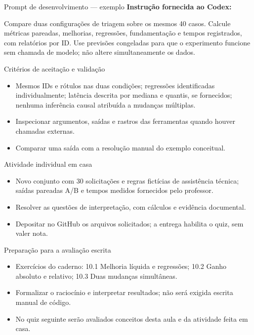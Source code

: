 \documentclass[10pt,aspectratio=169]{beamer}
\begin{document}
\begin{frame}[t]{Prompt de desenvolvimento — exemplo}
\small
\small\textbf{Instrução fornecida ao Codex:}\par\vspace{5mm}Compare duas configurações de triagem sobre os mesmos 40 casos. Calcule métricas pareadas, melhorias, regressões, fundamentação e tempos registrados, com relatórios por ID. Use previsões congeladas para que o experimento funcione sem chamada de modelo; não altere simultaneamente os dados.
\end{frame}

\begin{frame}[t]{Critérios de aceitação e validação}
\small
\begin{itemize}
\item Mesmos IDs e rótulos nas duas condições; regressões identificadas individualmente; latência descrita por mediana e quantis, se fornecidos; nenhuma inferência causal atribuída a mudanças múltiplas.
\item Inspecionar argumentos, saídas e rastros das ferramentas quando houver chamadas externas.
\item Comparar uma saída com a resolução manual do exemplo conceitual.
\end{itemize}
\end{frame}

\begin{frame}[t]{Atividade individual em casa}
\small
\begin{itemize}
\item Novo conjunto com 30 solicitações e regras fictícias de assistência técnica; saídas pareadas A/B e tempos medidos fornecidos pelo professor.
\item Resolver as questões de interpretação, com cálculos e evidência documental.
\item Depositar no GitHub os arquivos solicitados; a entrega habilita o quiz, sem valer nota.
\end{itemize}
\end{frame}

\begin{frame}[t]{Preparação para a avaliação escrita}
\small
\begin{itemize}
\item Exercícios do caderno: 10.1 Melhoria líquida e regressões; 10.2 Ganho absoluto e relativo; 10.3 Duas mudanças simultâneas.
\item Formalizar o raciocínio e interpretar resultados; não será exigida escrita manual de código.
\item No quiz seguinte serão avaliados conceitos desta aula e da atividade feita em casa.
\end{itemize}
\end{frame}
\end{document}
